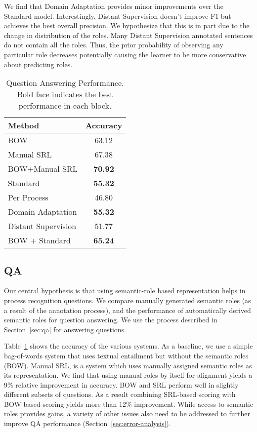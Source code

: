 We find that Domain Adaptation provides minor improvements over the Standard model. Interestingly, Distant Supervision doesn't improve F1 but achieves the best overall precision. 
We hypothesize that this is in part due to the change in distribution of the roles. 
Many Distant Supervision annotated sentences do not contain all the roles. 
Thus, the prior probability of observing any particular role decreases potentially causing the learner to be more conservative about predicting roles.  
\begin{table}[htdp]
\begin{center}
\begin{tabular}{|l|c|}
\hline
Method & Accuracy\\
\hline
BOW & 63.12\\
Manual SRL & 67.38\\
BOW+Manual SRL & {\bf 70.92}\\
\hline
Standard	& {\bf 55.32}\\
Per Process & 46.80 \\
Domain Adaptation & {\bf 55.32}\\
Distant Supervision & 51.77\\
\hline
BOW + Standard  & {\bf 65.24}\\
\hline
\end{tabular}
\caption{Question Answering Performance. Bold face indicates the best performance in each block.}
\label{tab:qa-results}
\end{center}
\vspace{-3ex}
\end{table}

\subsection{QA}
Our central hypothesis is that using semantic-role based representation helps in process recognition questions. 
We compare manually generated semantic roles (as a result of the annotation process), and the performance of automatically derived semantic roles for question answering. 
We use the process described in Section~\ref{sec:qa} for answering questions. 

Table~\ref{tab:qa-results} shows the accuracy of the various systems. 
As a baseline, we use a simple bag-of-words system that uses textual entailment but without the semantic roles (BOW). 
Manual SRL, is a system which uses manually assigned semantic roles as its representation. 
We find that using manual roles by itself for alignment yields a 9\% relative improvement in accuracy. 
BOW and SRL perform well in slightly different subsets of questions. 
As a result combining SRL-based scoring with BOW based scoring yields more than 12\% improvement. 
While access to semantic roles provides gains, a variety of other issues also need to be addressed to further improve QA performance (Section~\ref{sec:error-analysis}).

